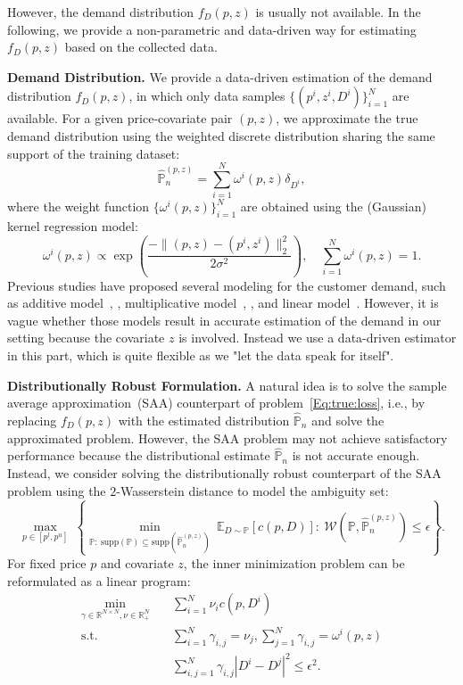 \documentclass[competition,nonblindrev]{informs3-competition}
\begin{document}
However, the demand distribution $f_D(p,z)$ is usually not available.
In the following, we provide a non-parametric and data-driven way for estimating $f_D(p,z)$ based on the collected data.

\noindent 
{\bf Demand Distribution.}
We provide a data-driven estimation of the demand distribution $f_D(p,z)$, in which only data samples $\{(p^i, z^i, D^i)\}_{i=1}^N$ are available. 
For a given price-covariate pair $(p,z)$, we approximate the true demand distribution using the weighted discrete distribution sharing the same support of the training dataset:
\[
\widehat{\mathbb{P}}_n^{(p,z)} = \sum_{i=1}^N\omega^i(p,z)\delta_{D^i},
\]
where the weight function $\{\omega^i(p,z)\}_{i=1}^N$ are obtained using the (Gaussian) kernel regression model:
\[
\omega^i(p,z)\propto \exp\left( 
\frac{-\|(p,z) - (p^i,z^i)\|_2^2}{2\sigma^2}
\right),\quad 
\sum_{i=1}^N\omega^i(p,z)=1.
\]
Previous studies have proposed several modeling for the customer demand, such as additive model~\cite{biswas2018price}, \cite{wang2015optimal}, multiplicative model~\cite{kazaz2015price}, \cite{salinger2011simple}, and linear model~\cite{bu2022context}. However, it is vague whether those models result in accurate estimation of the demand in our setting because the covariate $z$ is involved. 
Instead we use a data-driven estimator in this part, which is quite flexible as we "let the data speak for itself".


\noindent 
{\bf Distributionally Robust Formulation.}
A natural idea is to solve the sample average approximation~(SAA) counterpart of problem~\eqref{Eq:true:loss}, i.e., by replacing $f_D(p,z)$ with the estimated distribution $\widehat{\mathbb{P}}_n$ and solve the approximated problem.
However, the SAA problem may not achieve satisfactory performance because the distributional estimate $\widehat{\mathbb{P}}_n$ is not accurate enough.
Instead, we consider solving the distributionally robust counterpart of the SAA problem using the %
$2$-Wasserstein distance
to model the ambiguity set:
\[
\max_{p\in[p^l, p^u]}~\left\{\min_{ \mathbb{P}:~\mathrm{supp}(\mathbb{P})\subseteq \mathrm{supp}(\widehat{\mathbb{P}}_n^{(p,z)})}~\mathbb{E}_{D\sim \mathbb{P}}[c(p,D)]:~
\mathcal{W}\left(\mathbb{P},\widehat{\mathbb{P}}_n^{(p,z)}\right)\le \epsilon
\right\}.
\]
For fixed price $p$ and covariate $z$, the inner minimization problem can be reformulated as a linear program:
\[
\begin{aligned}
\min_{\gamma\in\mathbb{R}^{N\times N}, \nu\in\mathbb{R}^N_+}&\quad 
\sum_{i=1}^N\nu_ic(p, D^i)\\
\mbox{s.t.}&\quad \sum_{i=1}^N\gamma_{i,j}=\nu_j, \sum_{j=1}^N\gamma_{i,j}=\omega^i(p,z)\\
&\quad \sum_{i,j=1}^N\gamma_{i,j}|D^i - D^j|^2\le \epsilon^2.
\end{aligned}
\]
\end{document}
